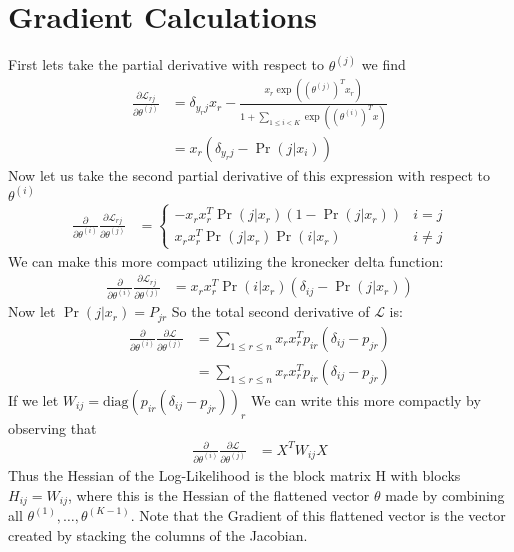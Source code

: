 \documentclass[12pt]{article}
\begin{document}
\section*{Gradient Calculations}
First lets take the partial derivative with respect to $\theta^{(j)}$ we find
\begin{align*}
    \frac{\partial \mathcal{L}_{rj}}{\partial \theta^{(j)}} &= \delta_{y_r j}x_r - \frac{x_r\exp((\theta^{(j)})^Tx_r)}{1 + \displaystyle \sum_{1 \leq i < K}\exp((\theta^{(i)})^Tx)} \\
    &= x_r(\delta_{y_rj} - \Pr(j|x_i))
\end{align*}
Now let us take the second partial derivative of this expression with respect to $\theta^{(i)}$
\begin{align*}
    \frac{\partial}{\partial \theta^{(i)}}\frac{\partial \mathcal{L}_{rj}}{\partial \theta^{(j)}} &= \begin{cases}
        -x_rx_r^T\Pr(j|x_r)(1 - \Pr(j|x_r)) & i = j \\
        x_rx_r^T\Pr(j|x_r)\Pr(i|x_r) & i \neq j
    \end{cases}
\end{align*}
We can make this more compact utilizing the kronecker delta function:
\begin{align*}
    \frac{\partial}{\partial \theta^{(i)}}\frac{\partial \mathcal{L}_{rj}}{\partial \theta^{(j)}} &=
    x_rx_r^T\Pr(i|x_r)(\delta_{ij} - \Pr(j|x_r))
\end{align*}
Now let $\Pr(j|x_r) = P_{jr}$ So the total second derivative of $\mathcal{L}$ is:
\begin{align*}
    \frac{\partial}{\partial \theta^{(i)}}\frac{\partial \mathcal{L}}{\partial \theta^{(j)}} &=
    \displaystyle \sum_{1 \leq r \leq n}x_rx_r^Tp_{ir}(\delta_{ij} - p_{jr}) \\
    &= \displaystyle \sum_{1 \leq r \leq n}x_rx_r^Tp_{ir}(\delta_{ij} - p_{jr})
\end{align*}
If we let $W_{ij} = \text{diag}(p_{ir}(\delta_{ij} - p_{jr}))_r$ We can write this more compactly by observing that
\begin{align*}
    \frac{\partial}{\partial \theta^{(i)}}\frac{\partial \mathcal{L}}{\partial \theta^{(j)}} &= X^TW_{ij}X
\end{align*}
Thus the Hessian of the Log-Likelihood is the block matrix H with
blocks $H_{ij} = W_{ij}$, where this is the Hessian of the flattened vector $\theta$
made by combining all $\theta^{(1)}, \ldots, \theta^{(K - 1)}$. Note that the Gradient
of this flattened vector is the vector created by stacking the columns of the Jacobian.
\end{document}
